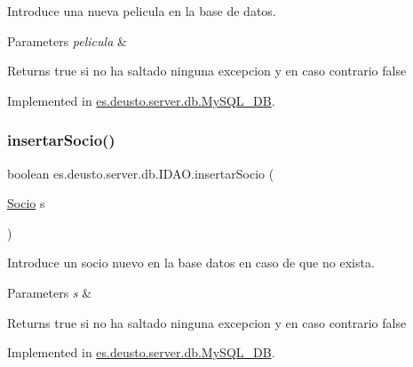 Introduce una nueva pelicula en la base de datos. 
\begin{DoxyParams}{Parameters}
{\em pelicula} & \\
\hline
\end{DoxyParams}
\begin{DoxyReturn}{Returns}
true si no ha saltado ninguna excepcion y en caso contrario false 
\end{DoxyReturn}


Implemented in \mbox{\hyperlink{classes_1_1deusto_1_1server_1_1db_1_1_my_s_q_l___d_b_aa78bfb2d1799dcaafbe2d47ded3d137c}{es.\+deusto.\+server.\+db.\+My\+S\+Q\+L\+\_\+\+DB}}.

\mbox{\label{interfacees_1_1deusto_1_1server_1_1db_1_1_i_d_a_o_a4b6652c5bec131e374c2243b579ea4cf}} 
\subsubsection{\texorpdfstring{insertarSocio()}{insertarSocio()}}
{\footnotesize\ttfamily boolean es.\+deusto.\+server.\+db.\+I\+D\+A\+O.\+insertar\+Socio (\begin{DoxyParamCaption}\item[{\mbox{\hyperlink{classes_1_1deusto_1_1client_1_1data_1_1_socio}{Socio}}}]{s }\end{DoxyParamCaption})}

Introduce un socio nuevo en la base datos en caso de que no exista. 
\begin{DoxyParams}{Parameters}
{\em s} & \\
\hline
\end{DoxyParams}
\begin{DoxyReturn}{Returns}
true si no ha saltado ninguna excepcion y en caso contrario false 
\end{DoxyReturn}


Implemented in \mbox{\hyperlink{classes_1_1deusto_1_1server_1_1db_1_1_my_s_q_l___d_b_a0959c3a64f052449cb5d79444a2d0900}{es.\+deusto.\+server.\+db.\+My\+S\+Q\+L\+\_\+\+DB}}.

\mbox{\label{interfacees_1_1deusto_1_1server_1_1db_1_1_i_d_a_o_a6c40abe1ba302500ec0070a50c234ecf}} 
